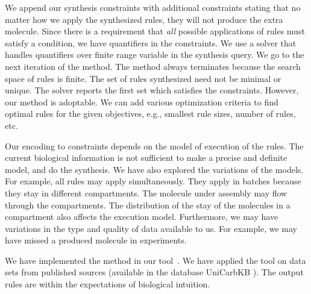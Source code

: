 We append our synthesis constraints with additional constraints stating that
no matter how we apply the synthesized rules, they will not produce the extra molecule.
Since there is a requirement that {\em all} possible applications of rules must satisfy
a condition, we have quantifiers in the constraints.
We use a solver that handles quantifiers over finite range variable in
the synthesis query.
We go to the next iteration of the method.
The method always terminates because the search space of rules is finite.
The set of rules synthesized need not be minimal or unique. The solver reports
the first set which satisfies the constraints.
However, our method is adoptable. We can add various optimization criteria to
find optimal rules for the given objectives, e.g., smallest rule sizes,
number of rules, etc.

Our encoding to constraints depends on the model of execution of the rules.
The current biological information is not sufficient to make a precise
and definite model, and do the synthesis.
We have also explored the variations of the models. For example, all rules
may apply simultaneously. They apply in batches because they
stay in different compartments.
The molecule under assembly may flow through the compartments.
The distribution of the stay of the molecules in a compartment also affects
the execution model.
Furthermore, we may have variations in the type and quality of data available to us. For example, we may have missed a produced molecule in experiments.

We have implemented the method in our tool~\ourtool. %
We have applied the tool on data sets from published sources (available in the database UniCarbKB \cite{Campbell2013}).
The output rules are within the expectations of biological
intuition.




